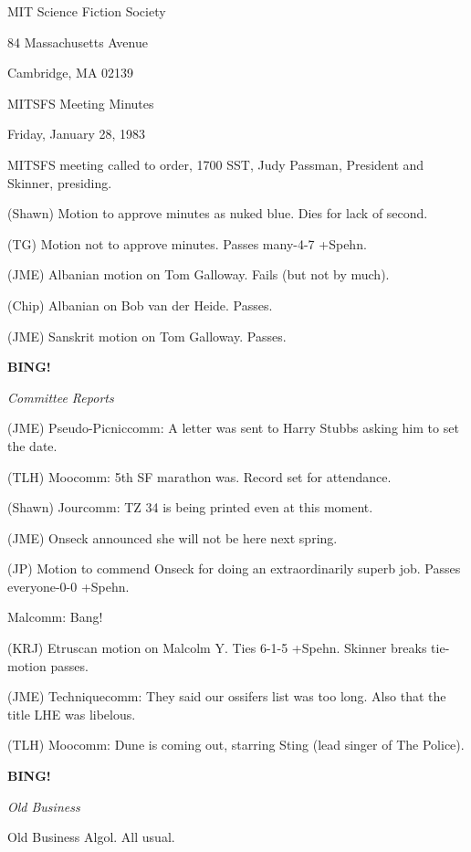 \documentclass[12pt]{article}
\newcommand{\bing}{{\bf BING!} }
\newcommand{\goto}[1]{\bing \vskip 12pt \centerline{{\em{#1}}}}
\begin{document}
\begin{center}

MIT Science Fiction Society 

84 Massachusetts Avenue

Cambridge, MA 02139

\vspace{12pt}

MITSFS Meeting Minutes 

Friday, January 28, 1983

\end{center}
 
\vspace{18pt}

\setlength{\parskip}{6pt}

\noindent
MITSFS meeting called to order, 1700 SST,
Judy Passman, President and Skinner, presiding.

(Shawn) Motion to approve minutes as nuked blue. Dies for lack of second.

(TG) Motion not to approve minutes. Passes many-4-7 +Spehn.

(JME) Albanian motion on Tom Galloway. Fails (but not by much).

(Chip) Albanian on Bob van der Heide. Passes.

(JME) Sanskrit motion on Tom Galloway. Passes.

\goto{Committee Reports}

(JME) Pseudo-Picniccomm: A letter was sent to Harry Stubbs asking him to set the date.

(TLH) Moocomm: 5th SF marathon was. Record set for attendance.

(Shawn) Jourcomm: TZ 34 is being printed even at this moment.

(JME) Onseck announced she will not be here next spring.

(JP) Motion to commend Onseck for doing an extraordinarily superb job. Passes everyone-0-0 +Spehn.

Malcomm: Bang!

(KRJ) Etruscan motion on Malcolm Y. Ties 6-1-5 +Spehn. Skinner breaks tie- motion passes.

(JME) Techniquecomm: They said our ossifers list was too long. Also that the title LHE was libelous.

(TLH) Moocomm: Dune is coming out, starring Sting (lead singer of The Police).

\goto{Old Business}

Old Business Algol. All usual.
\end{document}
